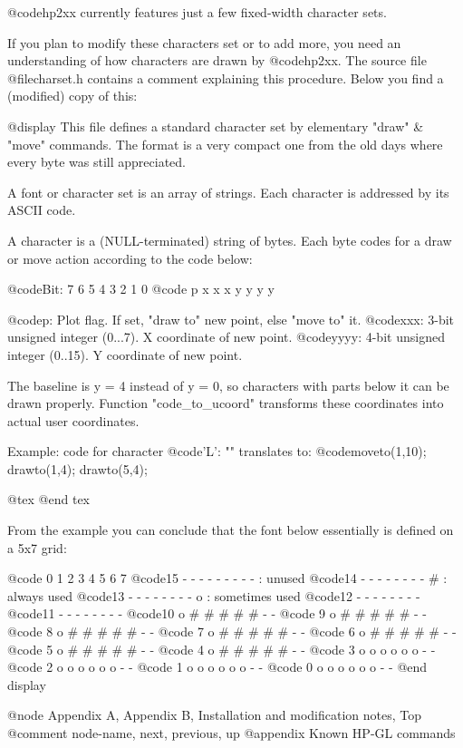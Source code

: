 @code{hp2xx} currently features just a few fixed-width  character sets.

If you plan to modify these characters set or to add more,
you need an understanding of how characters are drawn by
@code{hp2xx}. The source file @file{charset.h} contains a comment
explaining this procedure. Below you find a (modified) copy of
this:

@display
 This file defines a standard character set by elementary
 "draw" & "move" commands. The format is a very compact one from
 the old days where every byte was still appreciated.

 A font or character set is an array of strings. Each character is
 addressed by its ASCII code.

 A character is a (NULL-terminated) string of bytes. Each byte
 codes for a draw or move action according to the code below:

     @code{Bit: 7 6 5 4 3 2 1 0}
     @code{     p x x x y y y y}

 @code{p:   } Plot flag. If set, "draw to" new point, else "move to" it.
 @code{xxx: } 3-bit unsigned integer  (0...7). X coordinate of new point.
 @code{yyyy:} 4-bit unsigned integer (0..15). Y coordinate of new point.

 The baseline is y = 4 instead of y = 0, so characters with parts
 below it can be drawn properly. Function "code_to_ucoord" transforms
 these coordinates into actual user coordinates.

 Example:  code for character @code{'L': ""} translates to:
           @code{moveto(1,10); drawto(1,4); drawto(5,4);}

@tex
\page
@end tex

 From the example you can conclude that the font below essentially is
 defined on a 5x7 grid:

     @code{    0 1 2 3 4 5 6 7}
     @code{15  - - - - - - - -     - : unused}
     @code{14  - - - - - - - -     # : always used}
     @code{13  - - - - - - - -     o : sometimes used}
     @code{12  - - - - - - - -}
     @code{11  - - - - - - - -}
     @code{10  o # # # # # - -}
     @code{ 9  o # # # # # - -}
     @code{ 8  o # # # # # - -}
     @code{ 7  o # # # # # - -}
     @code{ 6  o # # # # # - -}
     @code{ 5  o # # # # # - -}
     @code{ 4  o # # # # # - -}
     @code{ 3  o o o o o o - -}
     @code{ 2  o o o o o o - -}
     @code{ 1  o o o o o o - -}
     @code{ 0  o o o o o o - -}
@end display



@node Appendix A, Appendix B, Installation and modification notes, Top
@comment  node-name,  next,  previous,  up
@appendix   Known HP-GL commands

